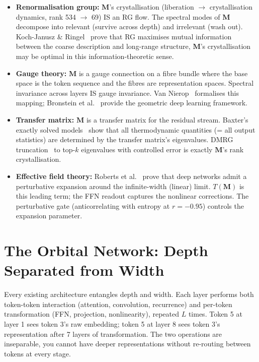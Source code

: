 \documentclass[11pt, a4paper]{article}
\newcommand{\M}{\mathbf{M}}
\theoremstyle{plain}
\theoremstyle{definition}
\theoremstyle{remark}
\begin{document}
\begin{itemize}[nosep]
\item \textbf{Renormalisation group:} $\M$'s crystallisation (liberation $\to$ crystallisation dynamics, rank 534 $\to$ 69) IS an RG flow.
      The spectral modes of $\M$ decompose into relevant (survive across depth) and irrelevant (wash out).
      Koch-Janusz \& Ringel~\cite{kochjanusz2018rg} prove that RG maximises mutual information between the coarse description and long-range structure, $\M$'s crystallisation may be optimal in this information-theoretic sense.

\item \textbf{Gauge theory:} $\M$ is a gauge connection on a fibre bundle where the base space is the token sequence and the fibres are representation spaces.
      Spectral invariance across layers IS gauge invariance.
      Van Nierop~\cite{vannierop2024gauge} formalises this mapping; Bronstein et al.~\cite{bronstein2021gdl} provide the geometric deep learning framework.

\item \textbf{Transfer matrix:} $\M$ is a transfer matrix for the residual stream.
      Baxter's exactly solved models~\cite{baxter1982exactly} show that all thermodynamic quantities (= all output statistics) are determined by the transfer matrix's eigenvalues.
      DMRG truncation~\cite{white2005dmrg} to top-$k$ eigenvalues with controlled error is exactly $\M$'s rank crystallisation.

\item \textbf{Effective field theory:} Roberts et al.~\cite{roberts2022principles} prove that deep networks admit a perturbative expansion around the infinite-width (linear) limit.
      $T(\M)$ is this leading term; the FFN readout captures the nonlinear corrections.
      The perturbative gate (anticorrelating with entropy at $r = -0.95$) controls the expansion parameter.
\end{itemize}


\section{The Orbital Network: Depth Separated from Width}
\label{sec:orbital-network}

Every existing architecture entangles depth and width.
Each layer performs both token-token interaction (attention, convolution, recurrence) and per-token transformation (FFN, projection, nonlinearity), repeated $L$ times.
Token 5 at layer 1 sees token 3's raw embedding; token 5 at layer 8 sees token 3's representation after 7 layers of transformation.
The two operations are inseparable, you cannot have deeper representations without re-routing between tokens at every stage.
\end{document}
